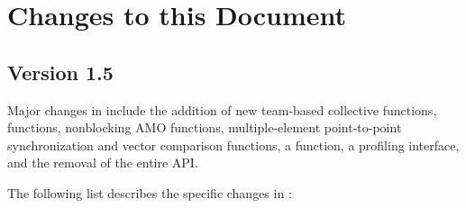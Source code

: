 \chapter{Changes to this Document}\label{sec:changelog}

\section{Version 1.5}
Major changes in \openshmem[1.5] include the addition of new team-based
collective functions,  functions, nonblocking \ac{AMO}
functions, multiple-element point-to-point synchronization and vector
comparison functions, a  function, a profiling
interface, and the removal of the entire \Fortran API.

The following list describes the specific changes in \openshmem[1.5]:
